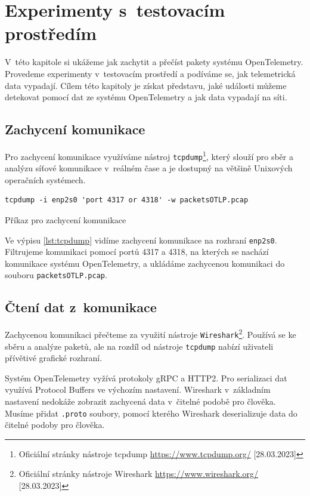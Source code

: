 \chapter{Experimenty s~testovacím prostředím}
V~této kapitole si ukážeme jak zachytit a přečíst pakety systému OpenTelemetry. Provedeme experimenty v~testovacím prostředí a podíváme se, jak telemetrická data vypadají. Cílem této kapitoly je získat představu, jaké události můžeme detekovat pomocí dat ze systému OpenTelemetry a jak data vypadají na síti.

\section{Zachycení komunikace}
Pro zachycení komunikace využíváme nástroj \texttt{tcpdump}\footnote{Oficiální stránky nástroje tcpdump \url{https://www.tcpdump.org/} [28.03.2023]}, který slouží pro sběr a analýzu síťové komunikace v~reálném čase a je dostupný na většině Unixových operačních systémech.

\begin{listing}[H]
    \begin{verbatim}
tcpdump -i enp2s0 'port 4317 or 4318' -w packetsOTLP.pcap
\end{verbatim}
    \caption{Příkaz pro zachycení komunikace}
    \label{lst:tcpdump}
\end{listing}

Ve výpisu \ref{lst:tcpdump} vidíme zachycení komunikace na rozhraní \texttt{enp2s0}. Filtrujeme komunikaci pomocí portů 4317 a 4318, na kterých se nachází komunikace systému OpenTelemetry, a ukládáme zachycenou komunikaci do souboru \texttt{packetsOTLP.pcap}.


\section{Čtení dat z~komunikace}

Zachycenou komunikaci přečteme za využití nástroje \texttt{Wireshark}\footnote{Oficiální stránky nástroje Wireshark \url{https://www.wireshark.org/} [28.03.2023]}. Používá se ke sběru a analýze paketů, ale na rozdíl od nástroje \texttt{tcpdump} nabízí uživateli přívětivé grafické rozhraní.

Systém OpenTelemetry vyžívá protokoly gRPC a HTTP2. Pro serializaci dat využívá Protocol Buffers ve výchozím nastavení. Wireshark v~základním nastavení nedokáže zobrazit zachycená data v~čitelné podobě pro člověka. Musíme přidat \texttt{.proto} soubory, pomocí kterého Wireshark deserializuje data do čitelné podoby pro člověka.

